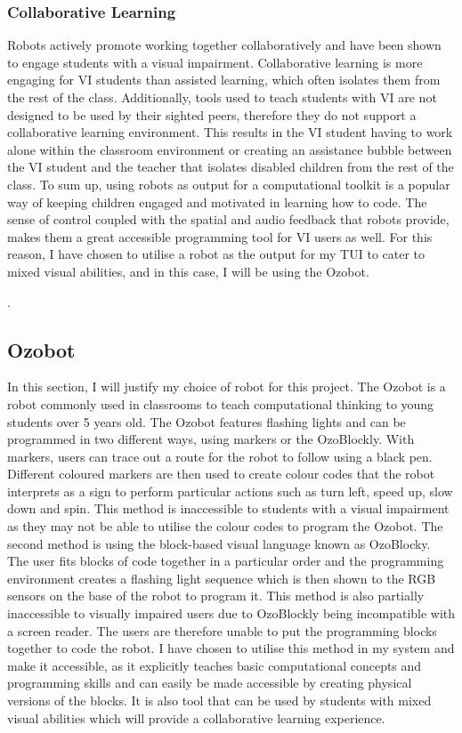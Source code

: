 \documentclass[oneside,%
                    author={Malak Hajji},
                    degree={BSc},
                    title={Designing An Accessible Computational Toolkit For Students},
                  subtitle={With Mixed Visual Abilities}]{dissertation}
\begin{document}
\subsubsection{Collaborative Learning}
Robots actively promote working together collaboratively and have been shown to engage students with a visual impairment\cite{8f}. Collaborative learning is more engaging for VI students than assisted learning, which often isolates them from the rest of the class\cite{43f}. Additionally, tools used to teach students with VI are not designed to be used by their sighted peers, therefore they do not support a collaborative learning environment. This results in the VI student having to work alone within the classroom environment or creating an assistance bubble between the VI student and the teacher that isolates disabled children from the rest of the class\cite{metatla}.
\newline
To sum up, using robots as output for a computational toolkit is a popular way of keeping children engaged and motivated in learning how to code. The sense of control coupled with the spatial and audio feedback that robots provide, makes them a great accessible programming tool for VI users as well. For this reason, I have chosen to utilise a robot as the output for my TUI to cater to mixed visual abilities, and in this case, I will be using the Ozobot.

.
\subsection{Ozobot}
In this section, I will justify my choice of robot for this project. The Ozobot is a robot commonly used in classrooms to teach computational thinking to young students over 5 years old. The Ozobot features flashing lights and can be programmed in two different ways, using markers or the OzoBlockly. 
With markers, users can trace out a route for the robot to follow using a black pen. Different coloured markers are then used to create colour codes that the robot interprets as a sign to perform particular actions such as turn left, speed up, slow down and spin. This method is inaccessible to students with a visual impairment as they may not be able to utilise the colour codes to program the Ozobot. The second method is using the block-based visual language known as OzoBlocky. The user fits blocks of code together in a particular order and the programming environment creates a flashing light sequence which is then shown to the RGB sensors on the base of the robot to program it. This method is also partially inaccessible to visually impaired users due to OzoBlockly being incompatible with a screen reader. The users are therefore unable to put the programming blocks together to code the robot. I have chosen to utilise this method in my system and make it accessible, as it explicitly teaches basic computational concepts and programming skills and can easily be made accessible by creating physical versions of the blocks. It is also tool that can be used by students with mixed visual abilities which will provide a collaborative learning experience.
\end{document}
